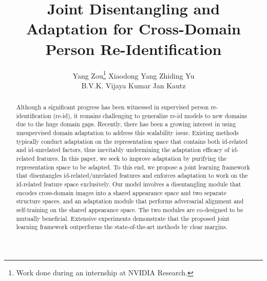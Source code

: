 \documentclass[runningheads]{llncs}
\begin{document}
\pagestyle{headings}
\mainmatter
\def\ECCVSubNumber{2974}  

\newcommand{\XY}[1]{{\color{cyan}[XY: #1]}}
\newcommand{\ZY}[1]{{\color{red}[ZY: #1]}}
\newcommand{\JK}[1]{{\color{magenta}[JK: #1]}}
\newcommand{\Yang}[1]{{\color{blue}[Yang: #1]}}

\renewcommand{\tabcolsep}{2.5pt}

\title{Joint Disentangling and Adaptation for Cross-Domain Person Re-Identification} 

\begin{comment}
\titlerunning{ECCV-20 submission ID \ECCVSubNumber} 
\authorrunning{ECCV-20 submission ID \ECCVSubNumber} 
\author{Anonymous ECCV submission}
\institute{Paper ID \ECCVSubNumber}
\end{comment}


\author{Yang Zou\thanks{Work done during an internship at NVIDIA Research.} \quad Xiaodong Yang \quad Zhiding Yu \quad \\ B.V.K. Vijaya Kumar \quad Jan Kautz}
\maketitle


\begin{abstract}
Although a significant progress has been witnessed in supervised person re-identification (re-id), it remains challenging to generalize re-id models to new domains due to the huge domain gaps. Recently, there has been a growing interest in using unsupervised domain adaptation to address this scalability issue. Existing methods typically conduct adaptation on the representation space that contains both id-related and id-unrelated factors, thus inevitably undermining the adaptation efficacy of id-related features. In this paper, we seek to improve adaptation by purifying the representation space to be adapted. To this end, we propose a joint learning framework that disentangles id-related/unrelated features and enforces adaptation to work on the id-related feature space exclusively. Our model involves a disentangling module that encodes cross-domain images into a shared appearance space and two separate structure spaces, and an adaptation module that performs adversarial alignment and self-training on the shared appearance space. The two modules are co-designed to be mutually beneficial. Extensive experiments demonstrate that the proposed joint learning framework outperforms the state-of-the-art methods by clear margins. 
\end{abstract}
\end{document}
